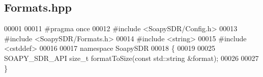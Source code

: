 \subsection{Formats.\+hpp}
\label{Formats_8hpp_source}

\begin{DoxyCode}
00001 
00011 \textcolor{preprocessor}{#pragma once}
00012 \textcolor{preprocessor}{#include <SoapySDR/Config.h>}
00013 \textcolor{preprocessor}{#include <SoapySDR/Formats.h>}
00014 \textcolor{preprocessor}{#include <string>}
00015 \textcolor{preprocessor}{#include <cstddef>}
00016 
00017 \textcolor{keyword}{namespace }SoapySDR
00018 \{
00019 
00025 SOAPY_SDR_API \textcolor{keywordtype}{size\_t} formatToSize(\textcolor{keyword}{const} std::string &format);
00026 
00027 \}
\end{DoxyCode}
